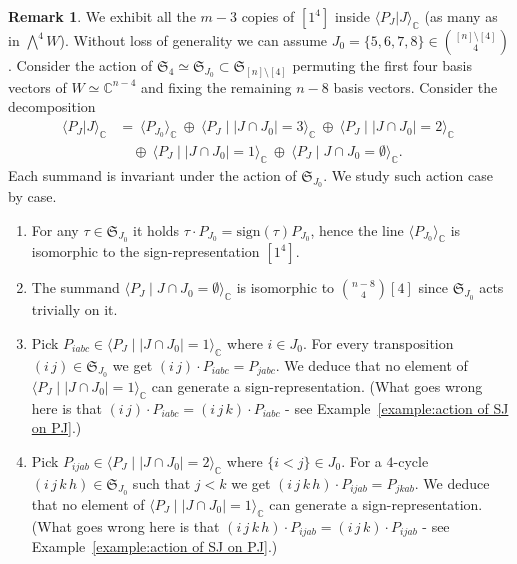 \documentclass[11pt,reqno]{amsart}
\theoremstyle{definition}
\newtheorem{remark}[theorem]{Remark}
\numberwithin{theorem}{section}
\newcommand{\sign}{\mathrm{sign}}
\numberwithin{equation}{section}
\begin{document}
\begin{remark}
We exhibit all the $m-3$ copies of $[1^4]$ inside $\langle P_J|J\rangle_\mathbb C$ (as many as in $\bigwedge^4W$). Without loss of generality we can assume $J_0=\{5,6,7,8\} \in \binom{[n]\setminus [4]}{4}$. Consider the action of $\mathfrak{S}_4\simeq \mathfrak{S}_{J_0} \subset \mathfrak{S}_{[n]\setminus [4]}$ permuting the first four basis vectors of $W\simeq \mathbb C^{n-4}$ and fixing the remaining $n-8$ basis vectors. Consider the decomposition
\begin{align*}
    \langle P_J|J\rangle_{\mathbb C} & = \ \langle P_{J_0}\rangle_{\mathbb C} \ \oplus \ \langle P_J \mid |J\cap J_0|=3\rangle_{\mathbb C} \ \oplus \ \langle P_J \mid |J\cap J_0|=2\rangle_{\mathbb C} \  \\
    & \quad \oplus \ \langle P_J \mid |J\cap J_0|=1\rangle_{\mathbb C} \ \oplus \ \langle P_J \mid J\cap J_0=\emptyset \rangle_{\mathbb C} .
    \end{align*}
Each summand is invariant under the action of $\mathfrak{S}_{J_0}$. We study such action case by case.
\begin{enumerate}
\item For any $\tau \in \mathfrak{S}_{J_0}$ it holds $\tau \cdot P_{J_0} = \sign(\tau)P_{J_0}$, hence the line $\langle P_{J_0}\rangle_\mathbb C$ is isomorphic to the sign-representation $[1^4]$.
\item The summand $\langle P_J \mid J\cap J_0=\emptyset \rangle_{\mathbb C}$ is isomorphic to $\binom{n-8}{4}[4]$ since $\mathfrak{S}_{J_0}$ acts trivially on it.
\item Pick $P_{iabc}\in \langle P_J \mid |J\cap J_0|=1\rangle_{\mathbb C}$ where $i\in J_0$. For every transposition $(i \, j)\in \mathfrak{S}_{J_0}$ we get $(i \, j)\cdot P_{iabc} = P_{jabc}$. We deduce that no element of $\langle P_J \mid |J\cap J_0|=1\rangle_{\mathbb C}$ can generate a sign-representation. (What goes wrong here is that $(i \, j)\cdot P_{iabc} = (i \, j \, k)\cdot P_{iabc}$ -  see Example~\ref{example:action of SJ on PJ}.) 
\item Pick $P_{ijab} \in \langle P_J \mid |J\cap J_0|=2\rangle_{\mathbb C}$ where $\{i< j \} \in J_0$. For a $4$-cycle $(i \, j \, k \, h)\in \mathfrak{S}_{J_0}$ such that $j<k$ we get $(i \, j \, k \, h)\cdot P_{ijab} = P_{jkab}$. We deduce that no element of $\langle P_J \mid |J\cap J_0|=1\rangle_{\mathbb C}$ can generate a sign-representation. (What goes wrong here is that $(i \, j \, k \, h)\cdot P_{ijab} = (i \, j \, k)\cdot P_{ijab}$ -  see Example~\ref{example:action of SJ on PJ}.)

\end{enumerate}
\end{remark}
\end{document}

